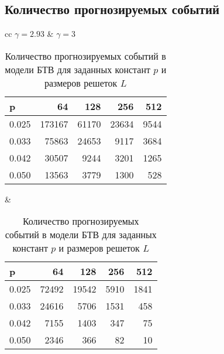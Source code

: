 \subsection{Количество прогнозируемых событий}\label{appendix:c}
\begin{table}[h]
	\caption{Количество прогнозируемых событий в модели БТВ для заданных констант $p$ и размеров решеток $L$}
	\begin{tabular}{cc}
		$\gamma = 2.93$ & $\gamma = 3$ \\
		\begin{tabular}{l|rrrr}
			\toprule
			p &     64  &    128 &    256 &   512 \\
			\midrule
			0.025 &  173167 &  61170 &  23634 &  9544 \\
			0.033 &   75863 &  24653 &   9117 &  3684 \\
			0.042 &   30507 &   9244 &   3201 &  1265 \\
			0.050 &   13563 &   3779 &   1300 &   528 \\
			\bottomrule
		\end{tabular} &
		\begin{tabular}{l|rrrr}
			\toprule
			p &    64  &    128 &   256 &   512 \\
			\midrule
			0.025 &  72492 &  19542 &  5910 &  1841 \\
			0.033 &  24616 &   5706 &  1531 &   458 \\
			0.042 &   7155 &   1403 &   347 &    75 \\
			0.050 &   2346 &    366 &    82 &    10 \\
			\bottomrule
		\end{tabular}
	\end{tabular}
\end{table}

